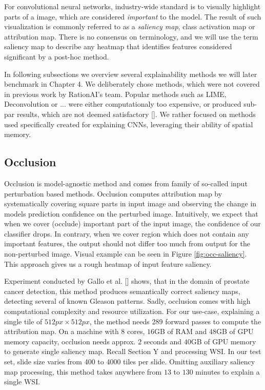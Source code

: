 For convolutional neural networks, industry-wide standard is to visually highlight parts of a image, which are considered \emph{important} to the model. The result of such visualization is commonly referred to as a \emph{saliency map}, class activation map or attribution map. There is no consensus on terminology, and we will use the term saliency map to describe any heatmap that identifies features considered significant by a post-hoc method. 

\noindent
In following subsections we overview several explainability methods we will later benchmark in Chapter 4. We deliberately chose methods, which were not covered in previous work by RationAI's team. Popular methods such as LIME, Deconvolution or ...  were either computationaly too expensive, or produced sub-par results, which are not deemed satisfactory []. We rather focused on methods used specifically created for explaining CNNs, leveraging their ability of spatial memory.



\subsection{Occlusion}

Occlusion is model-agnostic method and comes from family of so-called input perturbation based methods. Occlusion computes attribution map by systematically covering square parts in input image and observing the change in models prediction confidence on the perturbed image. Intuitively, we expect that when we cover (occlude) important part of the input image, the confidence of our classifier drops. In contrary, when we cover region which does not contain any important features, the output should not differ too much from output for the non-perturbed image. Visual example can be seen in Figure \ref{fig:occ-saliency}. This approach gives us a rough heatmap of input feature saliency.

Experiment conducted by Gallo et al. [] shows, that in the domain of prostate cancer detection, this method produces semantically correct saliency maps, detecting several of known Gleason patterns. Sadly, occlusion comes with high computational complexity and resource utilization. For our use-case, explaining a single tile of $512px \times 512px$, the method needs 289 forward passes to compute the attribution map. On a machine with $8$ cores, $16$GB of RAM and $48$GB of GPU memory capacity, occlusion needs approx. $2$ seconds and $40$GB of GPU memory to generate single saliency map. Recall Section Y and processing WSI. In our test set, slide size varies from 400 to 4000 tiles per slide. Omitting auxiliary saliency map processing, this method takes anywhere from $13$ to $130$ minutes to explain a single WSI.

